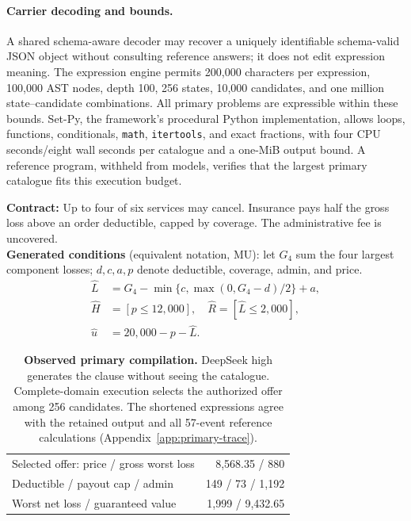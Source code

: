 \paragraph{Carrier decoding and bounds.}
A shared schema-aware decoder may recover a uniquely identifiable schema-valid JSON object without consulting reference answers; it does not edit expression meaning. The expression engine permits 200,000 characters per expression, 100,000 AST nodes, depth 100, 256 states, 10,000 candidates, and one million state--candidate combinations. All primary problems are expressible within these bounds. Set-Py, the framework's procedural Python implementation, allows loops, functions, conditionals, \texttt{math}, \texttt{itertools}, and exact fractions, with four CPU seconds/eight wall seconds per catalogue and a one-MiB output bound. A reference program, withheld from models, verifies that the largest primary catalogue fits this execution budget.

\begin{table}[t]
\centering\small
\begin{minipage}{\columnwidth}
\textbf{Contract:} Up to four of six services may cancel. Insurance pays half the gross loss above an order deductible, capped by coverage. The administrative fee is uncovered.\\[3pt]
\textbf{Generated conditions} (equivalent notation, MU): let $G_4$ sum the four largest component losses; $d,c,a,p$ denote deductible, coverage, admin, and price.
\[
\begin{aligned}
\widehat L&=G_4-\min\{c,\max(0,G_4-d)/2\}+a,\\
\widehat H&=[p\le12{,}000],\quad
\widehat R=[\widehat L\le2{,}000],\\
\widehat u&=20{,}000-p-\widehat L.
\end{aligned}
\]
\end{minipage}
\begin{tabular}{@{}lr@{}}
\toprule
Selected offer: price / gross worst loss & 8,568.35 / 880\\
Deductible / payout cap / admin & 149 / 73 / 1,192\\
Worst net loss / guaranteed value & 1,999 / 9,432.65\\
\bottomrule
\end{tabular}
\caption{\textbf{Observed primary compilation.} DeepSeek high generates the clause without seeing the catalogue. Complete-domain execution selects the authorized offer among 256 candidates. The shortened expressions agree with the retained output and all 57-event reference calculations (Appendix~\ref{app:primary-trace}).}
\label{tab:primary-trace}
\end{table}

